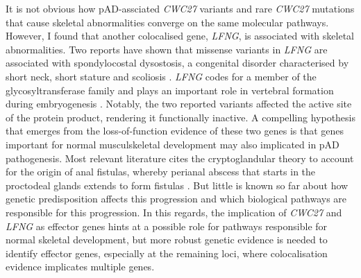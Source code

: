   It is not obvious how pAD-assciated \textit{CWC27} variants and rare \textit{CWC27} mutations that cause skeletal abnormalities converge on the same molecular pathways. However, I found that another colocalised gene, \textit{LFNG}, is associated with skeletal abnormalities. Two reports have shown that missense variants in \textit{LFNG} are associated with spondylocostal dysostosis, a congenital disorder characterised by short neck, short stature and scoliosis \cite{Otomo2019-os,Sparrow2006-vq}. \textit{LFNG} codes for a member of the glycosyltransferase family and plays an important role in vertebral formation during embryogenesis \cite{Serth2003-kn}. Notably, the two reported variants affected the active site of the protein product, rendering it functionally inactive. A compelling hypothesis that emerges from the loss-of-function evidence of these two genes is that genes important for normal musculskeletal development may also implicated in pAD pathogenesis. Most relevant literature cites the cryptoglandular theory to account for the origin of anal fistulas, whereby perianal abscess that starts in the proctodeal glands extends to form fistulas \cite{Wlodarczyk2021-xw}. But little is known so far about how genetic predisposition affects this progression and which biological pathways are responsible for this progression. In this regards, the implication of \textit{CWC27} and \textit{LFNG} as effector genes hints at a possible role for pathways responsible for normal skeletal development, but more robust genetic evidence is needed to identify effector genes, especially at the remaining loci, where colocalisation evidence implicates multiple genes.


